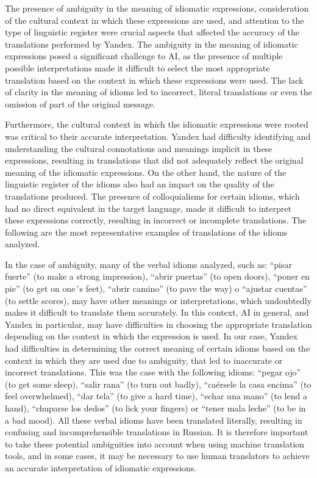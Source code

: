The presence of ambiguity in the meaning of idiomatic expressions,
consideration of the cultural context in which these expressions are
used, and attention to the type of linguistic register were crucial
aspects that affected the accuracy of the translations performed by
Yandex. The ambiguity in the meaning of idiomatic expressions posed a
significant challenge to AI, as the presence of multiple possible
interpretations made it difficult to select the most appropriate
translation based on the context in which these expressions were used.
The lack of clarity in the meaning of idioms led to incorrect, literal
translations or even the omission of part of the original message.

Furthermore, the cultural context in which the idiomatic expressions
were rooted was critical to their accurate interpretation. Yandex had
difficulty identifying and understanding the cultural connotations and
meanings implicit in these expressions, resulting in translations that
did not adequately reflect the original meaning of the idiomatic
expressions. On the other hand, the nature of the linguistic register of
the idioms also had an impact on the quality of the translations
produced. The presence of colloquialisms for certain idioms, which had
no direct equivalent in the target language, made it difficult to
interpret these expressions correctly, resulting in incorrect or
incomplete translations. The following are the most representative
examples of translations of the idioms analyzed.

In the case of ambiguity, many of the verbal idioms analyzed, such as:
``pisar fuerte'' (to make a strong impression), ``abrir puertas'' (to
open doors), ``poner en pie'' (to get on one´s feet), ``abrir camino''
(to pave the way) o ``ajustar cuentas'' (to settle scores), may have
other meanings or interpretations, which undoubtedly makes it difficult
to translate them accurately. In this context, AI in general, and Yandex
in particular, may have difficulties in choosing the appropriate
translation depending on the context in which the expression is used. In
our case, Yandex had difficulties in determining the correct meaning of
certain idioms based on the context in which they are used due to
ambiguity, that led to inaccurate or incorrect translations. This was
the case with the following idioms: ``pegar ojo'' (to get some sleep),
``salir rana'' (to turn out badly), ``caérsele la casa encima'' (to feel
overwhelmed), ``dar tela'' (to give a hard time), ``echar una mano'' (to
lend a hand), ``chuparse los dedos'' (to lick your fingers) or ``tener
mala leche'' (to be in a bad mood). All these verbal idioms have been
translated literally, resulting in confusing and incomprehensible
translations in Russian. It is therefore important to take these
potential ambiguities into account when using machine translation tools,
and in some cases, it may be necessary to use human translators to
achieve an accurate interpretation of idiomatic expressions.

